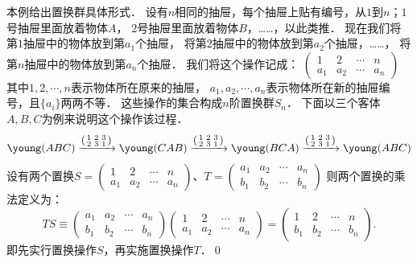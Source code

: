 \begin{example}\label{chtop:exm_ZhiHuanQun}
    本例给出置换群具体形式．
    设有$n$相同的抽屉，每个抽屉上贴有编号，从$1$到$n$；$1$号抽屉里面放着物体$A$，
    $2$号抽屉里面放着物体$B$，……，以此类推．
    现在我们将第$1$抽屉中的物体放到第$a_1$个抽屉，
    将第$2$抽屉中的物体放到第$a_2$个抽屉，……，
    将第$n$抽屉中的物体放到第$a_n$个抽屉．
    我们将这个操作记成：
    $(\begin{smallmatrix}
    	1 &2 &\cdots &n \\  a_1 &a_2 &\cdots &a_n
    \end{smallmatrix} )$
    其中$1, 2, \cdots, n$表示物体所在原来的抽屉，
    $a_1, a_2, \cdots, a_n $表示物体所在新的抽屉编号，且$\{a_i\}$两两不等．
    这些操作的集合构成$n$阶{\kaishu 置换群}$S_n$．
    下面以三个客体$A,B,C$为例来说明这个操作该过程．
    \begin{equation*}
        \young(ABC) \xrightarrow{\left(\begin{smallmatrix}
                1 &2 &3 \\  2 & 3 & 1  \end{smallmatrix} \right)}
        \young(CAB) \xrightarrow{\left(\begin{smallmatrix}
                1 &2 &3 \\  2 & 3 & 1  \end{smallmatrix} \right)}
        \young(BCA) \xrightarrow{\left(\begin{smallmatrix}
                1 &2 &3 \\  2 & 3 & 1  \end{smallmatrix} \right)}
        \young(ABC)
    \end{equation*}
    设有两个置换$S=(\begin{smallmatrix}
    	1 &2 &\cdots &n \\  a_1 &a_2 &\cdots &a_n
    \end{smallmatrix} )$、$T=(\begin{smallmatrix}
    a_1 &a_2 &\cdots &a_n \\ b_1 &b_2 &\cdots &b_n 
    \end{smallmatrix} )$
    则两个置换的乘法定义为：
    \begin{equation*}
    	TS\equiv 
    	\begin{pmatrix} a_1 &a_2 &\cdots &a_n \\ b_1 &b_2 &\cdots &b_n \end{pmatrix}
    	\begin{pmatrix} 1 &2 &\cdots &n \\  a_1 &a_2 &\cdots &a_n \end{pmatrix}
    	=\begin{pmatrix} 1 &2 &\cdots &n \\  b_1 &b_2 &\cdots &b_n \end{pmatrix} .
    \end{equation*}
    即先实行置换操作$S$，再实施置换操作$T$．\qed
\end{example}

